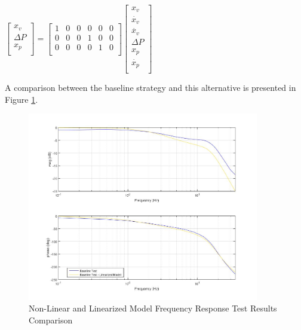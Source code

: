 \begin{footnotesize}
	\begin{center}
		$\begin{bmatrix}
		x_v \\
		\Delta P \\
		x_p \\
		\end{bmatrix} =
		\begin{bmatrix}
		1 & 0 & 0 & 0 & 0 & 0\\
		0 & 0 & 0 & 1 & 0 & 0\\
		0 & 0 & 0 & 0 & 1 & 0\\
		\end{bmatrix}
		\begin{bmatrix}
		x_v \\
		\dot{x_v} \\
		\ddot{x_v} \\
		\Delta P \\
		x_p \\
		\dot{x_p} \\
		\end{bmatrix} $
	\end{center}
\end{footnotesize}

A comparison between the baseline strategy and this alternative is presented in Figure \ref{fig:A_LinearBaselineScriptResults}.

\begin{figure}[H]
	\centering
	\centerline{\includegraphics[width=0.9\textwidth]{Figuras/4.DynamicStifinessOptimizationAlgorithm/4-3-2-3-LinearBaselineScriptResults.jpg}}
	\caption{Non-Linear and Linearized Model Frequency Response Test Results Comparison}
	\label{fig:A_LinearBaselineScriptResults}
\end{figure}

